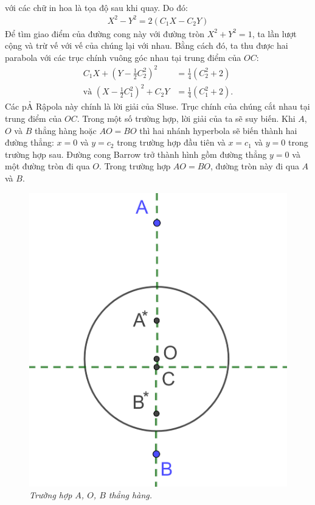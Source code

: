 \begin{multicols}{2}
\begin{align*}
	\end{align*}
	với các chữ in hoa là tọa độ sau khi quay.
	\vskip 0.1cm
	Do đó:
	\begin{align*}
		X^2 - Y^2 = 2(C_1X - C_2Y)
	\end{align*}
	Để tìm giao điểm của đường cong này với đường tròn $X^2+Y^2=1$, ta lần lượt cộng và trừ vế với vế của chúng lại với nhau. Bằng cách đó, ta thu được  hai parabola với các trục chính vuông góc nhau tại trung điểm của $OC$:
	\begin{align*}
		C_1X + \left(Y- \frac{1}{2}C_2^2\right)^2 &= \frac{1}{4}\left(C_2^2 + 2\right)\\
		\text{và } \left(X- \frac{1}{2}C_1^2\right)^2 + C_2Y &= \frac{1}{4}\left(C_1^2 + 2\right).
	\end{align*}
	Các pẢ Rậpola này chính là lời giải của Sluse. Trục chính của chúng cắt nhau tại trung điểm của $OC$.
	\vskip 0.1cm
	Trong một số trường hợp, lời giải của ta sẽ suy biến.  Khi $A$, $O$ và $B$ thẳng hàng hoặc $AO = BO$ thì hai nhánh hyperbola sẽ biến thành hai đường thẳng: $x=0$ và $y=c_2$ trong trường hợp đầu tiên và $x=c_1$ và $y=0$ trong trường hợp sau. Đường cong Barrow trở thành hình gồm đường thẳng $y=0$ và một đường tròn đi qua $O$. Trong trường hợp $AO = BO$, đường tròn này đi qua $A$ và $B$.
	\begin{figure}[H]
		\vspace*{-5pt}
		\centering
		\captionsetup{labelformat= empty, justification=centering}
		\includegraphics[width= 0.75\linewidth]{16}
		\caption{\small\textit{\color{lichsutoanhoc}Trường hợp $A$, $O$, $B$ thẳng hàng.}}

\end{figure}
\end{multicols}
